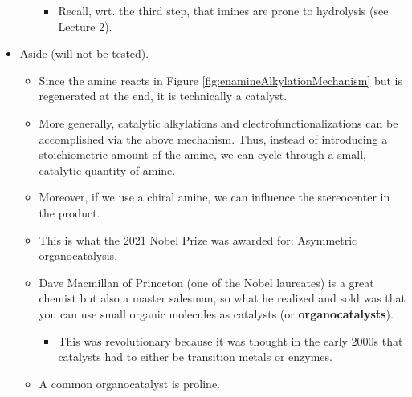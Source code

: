 \documentclass[../notes.tex]{subfiles}
\begin{document}
\begin{itemize}
\begin{itemize}
        \begin{itemize}
            \item Recall, wrt. the third step, that imines are prone to hydrolysis (see Lecture 2).
        \end{itemize}
    \end{itemize}
    \item Aside (will not be tested).
    \begin{itemize}
        \item Since the amine reacts in Figure \ref{fig:enamineAlkylationMechanism} but is regenerated at the end, it is technically a catalyst.
        \item More generally, catalytic alkylations and electrofunctionalizations can be accomplished via the above mechanism. Thus, instead of introducing a stoichiometric amount of the amine, we can cycle through a small, catalytic quantity of amine.
        \item Moreover, if we use a chiral amine, we can influence the stereocenter in the product.
        \item This is what the 2021 Nobel Prize was awarded for: Asymmetric organocatalysis.
        \item Dave Macmillan of Princeton (one of the Nobel laureates) is a great chemist but also a master salesman, so what he realized and sold was that you can use small organic molecules as catalysts (or \textbf{organocatalysts}).
        \begin{itemize}
            \item This was revolutionary because it was thought in the early 2000s that catalysts had to either be transition metals or enzymes.
        \end{itemize}
        \item A common organocatalyst is proline.
        

\end{itemize}
\end{itemize}
\end{document}
